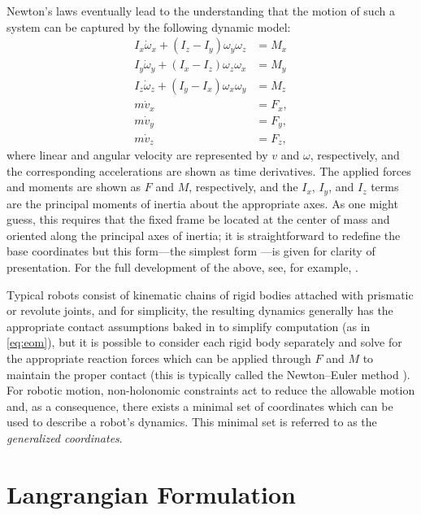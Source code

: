 Newton's laws eventually lead to the understanding that the motion of such a
system can be captured by the following dynamic model:
\begin{align*}
  I_{x} \dot{\omega}_{x} + (I_{z} - I_{y}) \omega_{y} \omega_{z} &= M_{x}\\
  I_{y} \dot{\omega}_{y} + (I_{x} - I_{z}) \omega_{z} \omega_{x} &= M_{y}\\
  I_{z} \dot{\omega}_{z} + (I_{y} - I_{x}) \omega_{x} \omega_{y} &= M_{z}\\
  m \dot{v}_{x} &= F_{x},\\
  m \dot{v}_{y} &= F_{y},\\
  m \dot{v}_{z} &= F_{z},
\end{align*}
where linear and angular velocity are represented by $v$ and $\omega$,
respectively, and the corresponding accelerations are shown as time
derivatives.
%
The applied forces and moments are shown as $F$ and $M$, respectively, and the
$I_{x}$, $I_{y}$, and $I_{z}$ terms are the principal moments of inertia about
the appropriate axes.
%
As one might guess, this requires that the fixed frame be located at the center
of mass and oriented along the principal axes of inertia; it is straightforward
to redefine the base coordinates but this form---the simplest form ---is given
for clarity of presentation.
%
For the full development of the above, see, for example, \cite[Ch. 8]{Baruh1998}.


Typical robots consist of kinematic chains of rigid bodies attached with
prismatic or revolute joints, and for simplicity, the resulting dynamics
generally has the appropriate contact assumptions baked in to simplify
computation (as in \eqref{eq:eom}), but it is possible to consider
each rigid body separately and solve for the appropriate reaction forces which
can be applied through $F$ and $M$ to maintain the proper contact (this is
typically called the Newton--Euler method \cite{Hollerbach1980}).
%
For robotic motion, non-holonomic constraints act to reduce the allowable motion
and, as a consequence, there exists a minimal set of coordinates which can be
used to describe a robot's dynamics.
%
This minimal set is referred to as the {\em generalized coordinates}.


\section{Langrangian Formulation}


